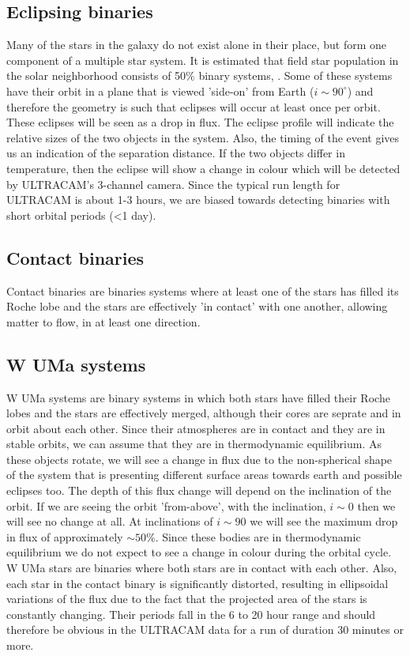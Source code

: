 \subsection{Eclipsing binaries}
Many of the stars in the galaxy do not exist alone in their place, but form one component of a multiple star system. It is estimated that field star population in the solar neighborhood consists of 50\% binary systems, \cite{binaryfraction}. Some of these systems have their orbit in a plane that is viewed 'side-on' from Earth ($i \sim 90^\circ$) and therefore the geometry is such that eclipses will occur at least once per orbit. These eclipses will be seen as a drop in flux. The eclipse profile will indicate the relative sizes of the two objects in the system. Also, the timing of the event gives us an indication of the separation distance. If the two objects differ in temperature, then the eclipse will show a change in colour which will be detected by ULTRACAM's 3-channel camera. Since the typical run length for ULTRACAM is about 1-3 hours, we are biased towards detecting binaries with short orbital periods (\textless 1 day). 

\subsection{Contact binaries}
Contact binaries are binaries systems where at least one of the stars has filled its Roche lobe and the stars are effectively 'in contact' with one another, allowing matter to flow, in at least one direction. 

\subsection{{W UMa} systems}
{W UMa} systems are binary systems in which both stars have filled their Roche lobes and the stars are effectively merged, although their cores are seprate and in orbit about each other. Since their atmospheres are in contact and they are in stable orbits, we can assume that they are in thermodynamic equilibrium. As these objects rotate, we will see a change in flux due to the non-spherical shape of the system that is presenting different surface areas towards earth and possible eclipses too. The depth of this flux change will depend on the inclination of the orbit. If we are seeing the orbit 'from-above', with the inclination, $i \sim 0$ then we will see no change at all. At inclinations of $i \sim 90$ we will see the maximum drop in flux of approximately $\sim50\%$. Since these bodies are in thermodynamic equilibrium we do not expect to see a change in colour during the orbital cycle. 
{W UMa} stars are binaries where both stars are in contact with each other. Also, each star in the contact binary is significantly distorted, resulting in ellipsoidal variations of the flux due to the fact that the projected area of the stars is constantly changing. Their periods fall in the 6 to 20 hour range and should therefore be obvious in the ULTRACAM data for a run of duration 30 minutes or more. 

